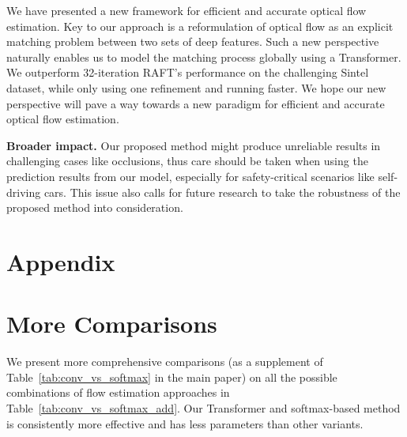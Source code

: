\documentclass[10pt,twocolumn,letterpaper]{article}
\begin{document}
We have presented a new framework for efficient and accurate optical flow estimation. Key to our approach is a reformulation of optical flow as an explicit matching problem between two sets of deep features. Such a new perspective naturally enables us to model the matching process globally using a Transformer. We outperform 32-iteration RAFT's performance on the challenging Sintel dataset, while only using one refinement and running faster.
We hope our new perspective will pave a way towards a new paradigm for efficient and accurate optical flow estimation.



\textbf{Broader impact.} Our proposed method might produce unreliable results in challenging cases like occlusions, thus care should be taken when using the prediction results from our model, especially for safety-critical scenarios like self-driving cars. This issue also calls for future research to take the robustness of the proposed method into consideration.



{\small


}



\newpage


\section*{Appendix}
\renewcommand{\thesection}{\Alph{section}}
\setcounter{section}{0}



\section{More Comparisons}

We present more comprehensive comparisons (as a supplement of Table~\ref{tab:conv_vs_softmax} in the main paper) on all the possible combinations of flow estimation approaches in Table~\ref{tab:conv_vs_softmax_add}. Our Transformer and softmax-based method is consistently more effective and has less parameters than other variants.
\end{document}
